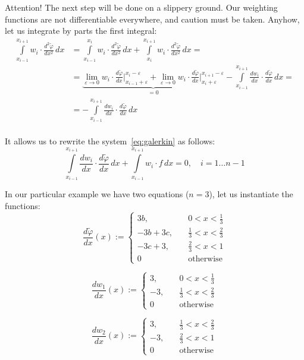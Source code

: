 \documentclass[notitlepage,oneside]{book}
\begin{document}
Attention! The next step will be done on a slippery ground.
Our weighting functions are not differentiable everywhere, and caution must be taken.
Anyhow, let us integrate by parts the first integral:
\begin{align*}
\int\limits_{x_{i-1}}^{x_{i+1}} w_i \cdot \frac{d^2\tilde{\varphi}}{dx^2}\,dx &= 
\int\limits_{x_{i-1}}^{x_{i}} w_i \cdot \frac{d^2\tilde{\varphi}}{dx^2}\,dx + 
\int\limits_{x_{i}}^{x_{i+1}} w_i \cdot \frac{d^2\tilde{\varphi}}{dx^2}\,dx = \\
& =\underbrace{\lim\limits_{\varepsilon\rightarrow 0}w_i\cdot \frac{d\tilde{\varphi}}{dx}\Big|_{x_{i-1}+\varepsilon}^{x_{i}-\varepsilon} +
\lim\limits_{\varepsilon\rightarrow 0}w_i\cdot \frac{d\tilde{\varphi}}{dx}\Big|_{x_{i}+\varepsilon}^{x_{i+1}-\varepsilon}}_{= 0} - \int\limits_{x_{i-1}}^{x_{i+1}} \frac{dw_i}{dx}\cdot \frac{d\tilde{\varphi}}{dx}\,dx  = \\
& = - \int\limits_{x_{i-1}}^{x_{i+1}} \frac{dw_i}{dx}\cdot \frac{d\tilde{\varphi}}{dx}\,dx \\
\end{align*}

It allows us to rewrite the system~\eqref{eq:galerkin} as follows:
\begin{equation}
\label{eq:galerkin:system}
\int\limits_{x_{i-1}}^{x_{i+1}} \frac{dw_i}{dx} \cdot \frac{d\tilde{\varphi}}{dx}\,dx + \int\limits_{x_{i-1}}^{x_{i+1}} w_i\cdot f\,dx = 0, \quad i = 1\dots n-1
\end{equation}

In our particular example we have two equations ($n=3$), let us instantiate the functions:
$$
\frac{d\tilde{\varphi}}{dx} (x) := \left\{
\begin{split}
3b, & \quad 0 < x < \frac{1}{3}\\
-3b+3c, & \quad \frac{1}{3} < x < \frac{2}{3}\\
-3c+3, & \quad \frac{2}{3} < x < 1\\
0 & \quad \text{otherwise}
\end{split}
\right.
$$

$$
\frac{dw_1}{dx} (x) := \left\{
\begin{split}
3, & \quad 0 < x < \frac{1}{3}\\
-3, & \quad \frac{1}{3} < x < \frac{2}{3}\\
0 & \quad \text{otherwise}
\end{split}
\right.
$$

$$
\frac{dw_2}{dx} (x) := \left\{
\begin{split}
3, & \quad \frac{1}{3} < x < \frac{2}{3}\\
-3, & \quad \frac{2}{3} < x < 1\\
0 & \quad \text{otherwise}
\end{split}
\right.
$$
\end{document}
